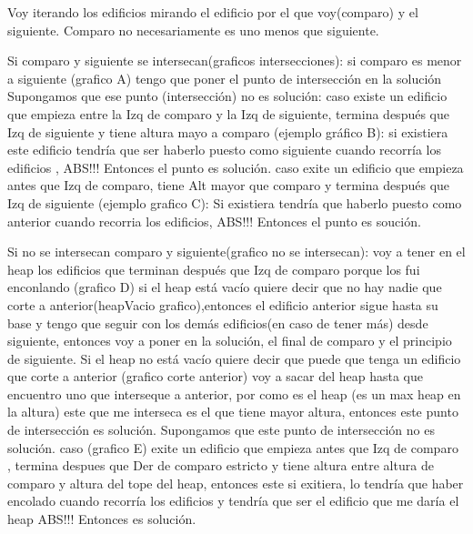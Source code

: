 \documentclass{article}
\begin{document}
Voy iterando los edificios mirando el edificio por el que voy(comparo) y el siguiente. Comparo no necesariamente es uno menos que siguiente.

Si comparo y siguiente se intersecan(graficos intersecciones):\newline
	si comparo es menor a siguiente (grafico A)\newline
		tengo que poner el punto de intersección en la solución\newline
		Supongamos que ese punto (intersección) no es solución:\newline
			caso existe un edificio que empieza entre la Izq de comparo y la Izq de siguiente, termina después que Izq de siguiente y tiene altura mayo a comparo (ejemplo gráfico B):\newline
			si existiera este edificio tendría que ser haberlo puesto como siguiente cuando recorría los edificios , ABS!!!\newline
			Entonces el punto es solución.\newline
			caso exite un edificio que empieza antes que Izq de comparo, tiene Alt mayor que comparo y termina después que Izq de siguiente (ejemplo grafico C):\newline
			Si existiera tendría que haberlo puesto como anterior cuando recorria los edificios, ABS!!!\newline
			Entonces el punto es soución.\newline

Si no se intersecan comparo y siguiente(grafico no se intersecan):\newline
	voy a tener en el heap los edificios que terminan después que Izq de comparo porque los fui enconlando (grafico D)
	si el heap está vacío quiere decir que no hay nadie que corte a anterior(heapVacio grafico),entonces el edificio anterior sigue hasta su base y tengo que seguir con los demás edificios(en caso de tener más) desde siguiente, entonces voy a poner en la solución, el final de comparo y el principio de siguiente.\newline
	Si el heap no está vacío quiere decir que puede que tenga un edificio que corte a anterior (grafico corte anterior)
		voy a sacar del heap hasta que encuentro uno que interseque a anterior, por como es el heap (es un max heap en la altura) este que me interseca es el que tiene mayor altura, entonces este punto de intersección es solución.\newline
		Supongamos que este punto de intersección no es solución.\newline
		caso (grafico E) exite un edificio que empieza antes que Izq de comparo , termina despues que Der de comparo estricto y tiene altura entre altura de comparo y altura del tope del heap, entonces este si exitiera, lo tendría que haber encolado cuando recorría los edificios y tendría que ser el edificio que me daría el heap ABS!!!\newline
Entonces es solución.\newline
\end{document}
